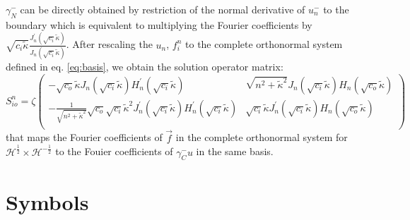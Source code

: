 \documentclass[12pt,journal,compsoc, onecolumn]{IEEEtran}
\begin{document}
$\gamma_N^-$ can be directly obtained by restriction of the normal derivative of $u_n^-$ to the boundary 
which is equivalent to multiplying the Fourier coefficients by $\sqrt{c_i \tilde \kappa}\frac{J_n^\prime(\sqrt{c_i}\tilde \kappa)}{J_n(\sqrt{c_i}\tilde \kappa)}$.
After rescaling the $u_n$, $f_i^n$ to the complete orthonormal system defined in eq. \ref{eq:basis},
we obtain the solution operator matrix: 
\begin{equation}
    S_{io}^n = 
    \zeta
    \begin{pmatrix}
        -\sqrt{c_o}\tilde \kappa J_n(\sqrt{c_i} \tilde \kappa) H_n^\prime(\sqrt{c_i} \tilde \kappa) & 
        \sqrt{n^2 + \tilde \kappa^2} J_n(\sqrt{c_i} \tilde \kappa) H_n(\sqrt{c_o} \tilde \kappa)  \\
        -\frac{1}{\sqrt{n^2 + \tilde \kappa^2}}\sqrt{c_o}\sqrt{c_i} \tilde \kappa^2 J^\prime_n(\sqrt{c_i} \tilde \kappa) H_n^\prime(\sqrt{c_i} \tilde \kappa) & 
        \sqrt{c_i} \tilde \kappa J^\prime_n(\sqrt{c_i} \tilde \kappa) H_n(\sqrt{c_o} \tilde \kappa) \\
    \end{pmatrix}
\end{equation}
\noindent
that maps the Fourier coefficients of $\vec{f}$ in the complete orthonormal system for $\mathcal{H}^{\frac{1}{2}}\times \mathcal{H}^{-\frac{1}{2}}$
 to the Fouier coefficients of $\gamma_C^-u$ in the same basis.

\newpage
\section*{Symbols}
\end{document}

